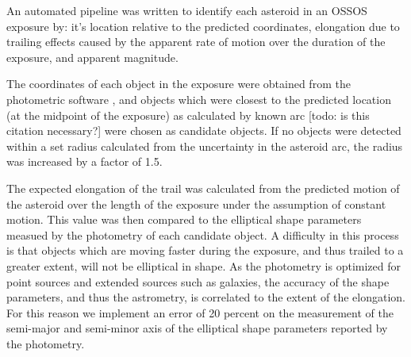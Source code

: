 \documentclass[iop,apj]{emulateapj}
\begin{document}
An automated pipeline was written to identify each asteroid in an OSSOS exposure by: it's location relative to the predicted coordinates,  elongation due to trailing effects caused by the apparent rate of motion over the duration of the exposure, and apparent magnitude. 

The coordinates of each object in the exposure were obtained from the photometric software \citep{sep}, and objects which were closest to the predicted location (at the midpoint of the exposure) as calculated by known arc \citep{jpl} [todo: is this citation necessary?] were chosen as candidate objects. If no objects were detected within a set radius calculated from the uncertainty in the asteroid arc, the radius was increased by a factor of 1.5.

The expected elongation of the trail was calculated from the predicted motion of the asteroid over the length of the exposure \citep{jpl} under the assumption of constant motion. This value was then compared to the elliptical shape parameters measued by the photometry of each candidate object. 
A difficulty in this process is that objects which are moving faster during the exposure, and thus trailed to a greater extent, will not be elliptical in shape. As the photometry is optimized for point sources and extended sources such as galaxies, the accuracy of the shape parameters, and thus the astrometry, is correlated to the extent of the elongation. For this reason we implement an error of 20 percent on the measurement of the semi-major and semi-minor axis of the elliptical shape parameters reported by the photometry. 
\end{document}
